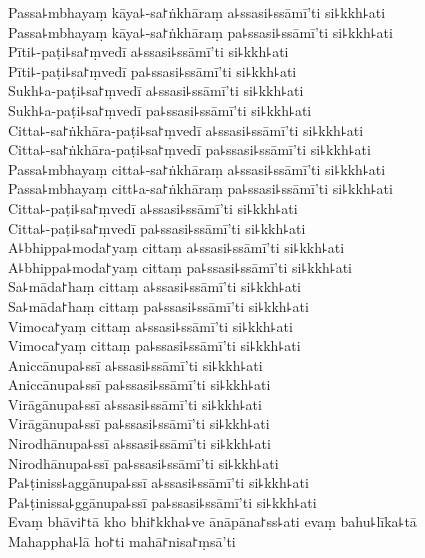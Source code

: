\documentclass[
  babelLanguage=english,
  final,
  webversion,
]{chantingbook}
\begin{document}
\clearpage

\enlargethispage{2\baselineskip}

Passa꜕mbhayaṃ kāya꜕-sa꜓ṅkhāraṃ a꜕ssasi꜕ssāmī'ti si꜕kkh꜕ati\\
Passa꜕mbhayaṃ kāya꜕-sa꜓ṅkhāraṃ pa꜕ssasi꜕ssāmī'ti si꜕kkh꜕ati\\
Pīti꜕-paṭi꜕sa꜓ṃvedī a꜕ssasi꜕ssāmī'ti si꜕kkh꜕ati\\
Pīti꜕-paṭi꜕sa꜓ṃvedī pa꜕ssasi꜕ssāmī'ti si꜕kkh꜕ati\\
Sukh꜕a-paṭi꜕sa꜓ṃvedī a꜕ssasi꜕ssāmī'ti si꜕kkh꜕ati\\
Sukh꜕a-paṭi꜕sa꜓ṃvedī pa꜕ssasi꜕ssāmī'ti si꜕kkh꜕ati\\
Citta꜕-sa꜓ṅkhāra-paṭi꜕sa꜓ṃvedī a꜕ssasi꜕ssāmī'ti si꜕kkh꜕ati\\
Citta꜕-sa꜓ṅkhāra-paṭi꜕sa꜓ṃvedī pa꜕ssasi꜕ssāmī'ti si꜕kkh꜕ati\\
Passa꜕mbhayaṃ citta꜕-sa꜓ṅkhāraṃ a꜕ssasi꜕ssāmī'ti si꜕kkh꜕ati\\
Passa꜕mbhayaṃ citt꜕a-sa꜓ṅkhāraṃ pa꜕ssasi꜕ssāmī'ti si꜕kkh꜕ati\\
Citta꜕-paṭi꜕sa꜓ṃvedī a꜕ssasi꜕ssāmī'ti si꜕kkh꜕ati\\
Citta꜕-paṭi꜕sa꜓ṃvedī pa꜕ssasi꜕ssāmī'ti si꜕kkh꜕ati\\
A꜕bhippa꜕moda꜓yaṃ cittaṃ a꜕ssasi꜕ssāmī'ti si꜕kkh꜕ati\\
A꜕bhippa꜕moda꜓yaṃ cittaṃ pa꜕ssasi꜕ssāmī'ti si꜕kkh꜕ati\\
Sa꜕māda꜓haṃ cittaṃ a꜕ssasi꜕ssāmī'ti si꜕kkh꜕ati\\
Sa꜕māda꜓haṃ cittaṃ pa꜕ssasi꜕ssāmī'ti si꜕kkh꜕ati\\
Vimoca꜓yaṃ cittaṃ a꜕ssasi꜕ssāmī'ti si꜕kkh꜕ati\\
Vimoca꜓yaṃ cittaṃ pa꜕ssasi꜕ssāmī'ti si꜕kkh꜕ati\\
Aniccānupa꜕ssī a꜕ssasi꜕ssāmī'ti si꜕kkh꜕ati\\
Aniccānupa꜕ssī pa꜕ssasi꜕ssāmī'ti si꜕kkh꜕ati\\
Virāgānupa꜕ssī a꜕ssasi꜕ssāmī'ti si꜕kkh꜕ati\\
Virāgānupa꜕ssī pa꜕ssasi꜕ssāmī'ti si꜕kkh꜕ati\\
Nirodhānupa꜕ssī a꜕ssasi꜕ssāmī'ti si꜕kkh꜕ati\\
Nirodhānupa꜕ssī pa꜕ssasi꜕ssāmī'ti si꜕kkh꜕ati\\
Pa꜕ṭiniss꜕aggānupa꜕ssī a꜕ssasi꜕ssāmī'ti si꜕kkh꜕ati\\
Pa꜕ṭinissa꜕ggānupa꜕ssī pa꜕ssasi꜕ssāmī'ti si꜕kkh꜕ati\\
Evaṃ bhāvi꜓tā kho bhi꜓kkha꜕ve ānāpāna꜓ss꜕ati evaṃ bahu꜕līka꜕tā\\
Mahappha꜕lā ho꜓ti mahā꜓nisa꜓ṃsā'ti
\end{document}
